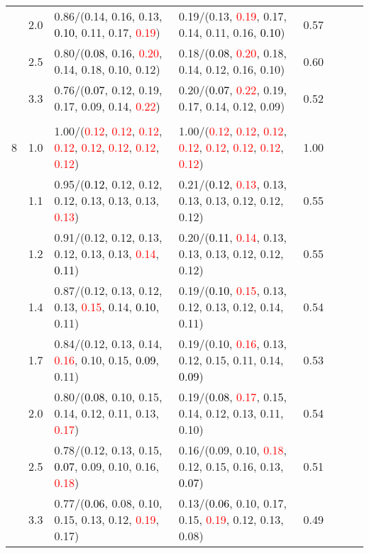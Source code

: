\documentclass[10pt,a4paper]{report}
\begin{document}
\begin{table}[!htbp]
\begin{center}
{\begin{tabular}{ccllcccc}
			&2.0&0.86/(0.14, 0.16, 0.13, \textcolor{black}{0.10}, 0.11, 0.17, \textcolor{red}{0.19})&0.19/(0.13, \textcolor{red}{0.19}, 0.17, 0.14, 0.11, 0.16, \textcolor{black}{0.10})&0.57\\
			&2.5&0.80/(\textcolor{black}{0.08}, 0.16, \textcolor{red}{0.20}, 0.14, 0.18, 0.10, 0.12)&0.18/(\textcolor{black}{0.08}, \textcolor{red}{0.20}, 0.18, 0.14, 0.12, 0.16, 0.10)&0.60\\
			&3.3&0.76/(\textcolor{black}{0.07}, 0.12, 0.19, 0.17, 0.09, 0.14, \textcolor{red}{0.22})&0.20/(\textcolor{black}{0.07}, \textcolor{red}{0.22}, 0.19, 0.17, 0.14, 0.12, 0.09)&0.52\\
			&&&&\\
			8			&1.0&1.00/(\textcolor{red}{0.12}, \textcolor{red}{0.12}, \textcolor{red}{0.12}, \textcolor{red}{0.12}, \textcolor{red}{0.12}, \textcolor{red}{0.12}, \textcolor{red}{0.12}, \textcolor{red}{0.12})&1.00/(\textcolor{red}{0.12}, \textcolor{red}{0.12}, \textcolor{red}{0.12}, \textcolor{red}{0.12}, \textcolor{red}{0.12}, \textcolor{red}{0.12}, \textcolor{red}{0.12}, \textcolor{red}{0.12})&1.00\\
			&1.1&0.95/(\textcolor{black}{0.12}, 0.12, 0.12, 0.12, 0.13, 0.13, 0.13, \textcolor{red}{0.13})&0.21/(\textcolor{black}{0.12}, \textcolor{red}{0.13}, 0.13, 0.13, 0.13, 0.12, 0.12, 0.12)&0.55\\
			&1.2&0.91/(0.12, 0.12, 0.13, 0.12, 0.13, 0.13, \textcolor{red}{0.14}, \textcolor{black}{0.11})&0.20/(\textcolor{black}{0.11}, \textcolor{red}{0.14}, 0.13, 0.13, 0.13, 0.12, 0.12, 0.12)&0.55\\
			&1.4&0.87/(0.12, 0.13, 0.12, 0.13, \textcolor{red}{0.15}, 0.14, \textcolor{black}{0.10}, 0.11)&0.19/(\textcolor{black}{0.10}, \textcolor{red}{0.15}, 0.13, 0.12, 0.13, 0.12, 0.14, 0.11)&0.54\\
			&1.7&0.84/(0.12, 0.13, 0.14, \textcolor{red}{0.16}, 0.10, 0.15, \textcolor{black}{0.09}, 0.11)&0.19/(0.10, \textcolor{red}{0.16}, 0.13, 0.12, 0.15, 0.11, 0.14, \textcolor{black}{0.09})&0.53\\
			&2.0&0.80/(\textcolor{black}{0.08}, 0.10, 0.15, 0.14, 0.12, 0.11, 0.13, \textcolor{red}{0.17})&0.19/(\textcolor{black}{0.08}, \textcolor{red}{0.17}, 0.15, 0.14, 0.12, 0.13, 0.11, 0.10)&0.54\\
			&2.5&0.78/(0.12, 0.13, 0.15, \textcolor{black}{0.07}, 0.09, 0.10, 0.16, \textcolor{red}{0.18})&0.16/(0.09, 0.10, \textcolor{red}{0.18}, 0.12, 0.15, 0.16, 0.13, \textcolor{black}{0.07})&0.51\\
			&3.3&0.77/(\textcolor{black}{0.06}, 0.08, 0.10, 0.15, 0.13, 0.12, \textcolor{red}{0.19}, 0.17)&0.13/(\textcolor{black}{0.06}, 0.10, 0.17, 0.15, \textcolor{red}{0.19}, 0.12, 0.13, 0.08)&0.49\\
			\bottomrule
		\end{tabular}}
	\end{center}
\end{table}
\end{document}

